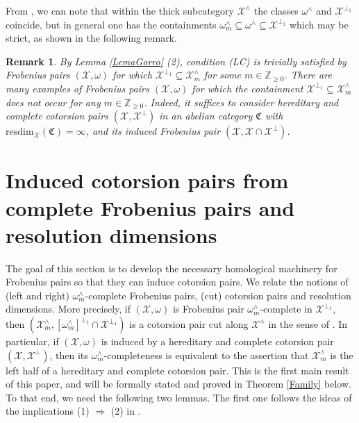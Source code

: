 \documentclass[10pt,reqno]{amsart}
\numberwithin{equation}{section}
\newtheorem{remark}[definition]{Remark}
\theoremstyle{remark}
\newcommand{\X}{\mathcal{X}}
\newcommand{\resdim}{\mathrm{resdim}}
\begin{document}
From \cite[Prop. 2.13]{BMSP}, we can note that within the thick subcategory $\X^\wedge$ the classes $\omega^\wedge$ and $\X^{\perp_1}$ coincide, but in general one has the containments $\omega^\wedge_m \subseteq \omega^\wedge \subseteq \X^{\perp_1}$ which may be strict, as shown in the following remark. 


\begin{remark}\label{rmk:strict_perp}
By Lemma \ref{LemaGorro} (2), condition {\sf (LC)} is trivially satisfied by Frobenius pairs $(\mathcal{X},\omega)$ for which $\mathcal{X}^{\perp_1} \subseteq \mathcal{X}^\wedge_m$ for some $m \in \mathbb{Z}_{\geq 0}$. There are many examples of Frobenius pairs $(\mathcal{X},\omega)$ for which the containment $\mathcal{X}^{\perp_1} \subseteq \mathcal{X}^\wedge_m$ does not occur for any $m \in \mathbb{Z}_{\geq 0}$. Indeed, it suffices to consider hereditary and complete cotorsion pairs $(\mathcal{X},\mathcal{X}^\perp)$ in an abelian category $\mathfrak{C}$ with $\resdim_{\mathcal{X}}(\mathfrak{C}) = \infty$, and its induced Frobenius pair $(\X,\X \cap \X^\perp)$. 
\end{remark}



\section{Induced cotorsion pairs from complete Frobenius pairs and resolution dimensions} \label{sec:induced_cotorsion}

The goal of this section is to develop the necessary homological machinery for Frobenius pairs so that they can induce cotorsion pairs. We relate the notions of (left and right) $\omega^{\wedge}_m$-complete Frobenius pairs, (cut) cotorsion pairs and resolution dimensions. More precisely, if $(\X,\omega)$ is Frobenius pair $\omega^{\wedge}_m$-complete in $\X^{\perp_1}$, then $(\X^\wedge_m, [\omega^{\wedge}_m]^{\perp_1} \cap \X^{\perp_1})$ is a cotorsion pair cut along $\X^{\wedge}$ in the sense of \cite{HMP-cut}. In particular, if $(\X,\omega)$ is induced by a hereditary and complete cotorsion pair $(\X,\X^\perp)$, then its $\omega^\wedge_m$-completeness is equivalent to the assertion that $\mathcal{X}^\wedge_m$ is the left half of a hereditary and complete cotorsion pair. This is the first main result of this paper, and will be formally stated and proved in Theorem \ref{Family} below. To that end, we need the following two lemmas. The first one follows the ideas of the implications (1) $\Rightarrow$ (2) in \cite[Thms. 2.5. \& 3.3]{Chains}.
\end{document}
